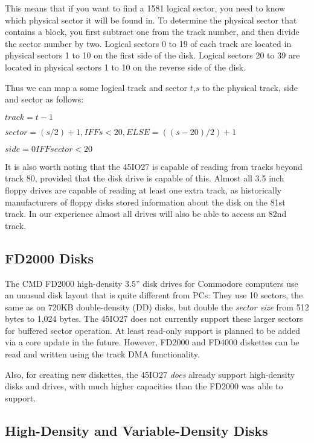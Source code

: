 This means that if you want to find a 1581 logical sector, you need to
know which physical sector it will be found in.  To determine the
physical sector that contains a block, you first subtract one from the
track number, and then divide the sector number by two.  Logical
sectors 0 to 19 of each track are located in physical sectors 1 to 10
on the first side of the disk.  Logical sectors 20 to 39 are
located in physical sectors 1 to 10 on the reverse side of the disk.

Thus we can map a some logical track and sector $t$,$s$ to the
physical track, side and sector as follows:

$track = t - 1$

$sector = (s/2)+1, IFF s < 20, ELSE = ((s-20)/2) + 1$

$side = 0 IFF sector < 20$

It is also worth noting that the 45IO27 is capable of reading from
tracks beyond track 80, provided that the disk drive is capable of
this.  Almost all 3.5 inch floppy drives are capable of reading at
least one extra track, as historically manufacturers of floppy disks
stored information about the disk on the 81st track.  In our
experience almost all drives will also be able to access an 82nd
track.

\subsection{FD2000 Disks}

The CMD\texttrademark{} FD2000\texttrademark{} high-density 3.5'' disk drives for Commodore\texttrademark{} computers
use an unusual disk layout that is quite different from PCs: They use 10 sectors,
the same as on 720KB double-density (DD) disks, but double the {\em sector size}
from 512 bytes to 1,024 bytes.  The 45IO27 does not currently support these
larger sectors for buffered sector operation. At least read-only support is planned to be added via a core update
in the future.  However, FD2000\texttrademark{} and FD4000\texttrademark{} diskettes
can be read and written using the track DMA functionality.

Also, for creating new diskettes, the 45IO27 {\em does} already support high-density disks and drives, with much
higher capacities than the FD2000 was able to support.

\subsection{High-Density and Variable-Density Disks}

